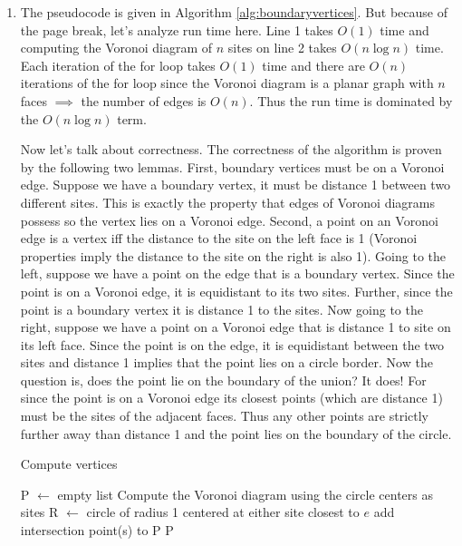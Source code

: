 \documentclass[11pt]{article}
\begin{document}
\answer
\begin{enumerate}
    \item The pseudocode is given in Algorithm \ref{alg:boundaryvertices}.
    But because of the page break, let's analyze run time here.
    Line 1 takes $O(1)$ time and computing the Voronoi diagram of $n$ sites on line 2 takes $O(n \log n)$ time.
    Each iteration of the for loop takes $O(1)$ time and there are $O(n)$ iterations of the for loop since the Voronoi diagram is a planar graph with $n$ faces $\implies$ the number of edges is $O(n)$.
    Thus the run time is dominated by the $O(n \log n)$ term. 
    
    Now let's talk about correctness.
    The correctness of the algorithm is proven by the following two lemmas.
    First, boundary vertices must be on a Voronoi edge.
    Suppose we have a boundary vertex, it must be distance 1 between two different sites.
    This is exactly the property that edges of Voronoi diagrams possess so the vertex lies on a Voronoi edge.
    Second, a point on an Voronoi edge is a vertex iff the distance to the site on the left face is 1 (Voronoi properties imply the distance to the site on the right is also 1).
    Going to the left, suppose we have a point on the edge that is a boundary vertex.
    Since the point is on a Voronoi edge, it is equidistant to its two sites.
    Further, since the point is a boundary vertex it is distance 1 to the sites.
    Now going to the right, suppose we have a point on a Voronoi edge that is distance 1 to site on its left face.
    Since the point is on the edge, it is equidistant between the two sites and distance 1 implies that the point lies on a circle border.
    Now the question is, does the point lie on the boundary of the union?
    It does!
    For since the point is on a Voronoi edge its closest points (which are distance 1) must be the sites of the adjacent faces.
    Thus any other points are strictly further away than distance 1 and the point lies on the boundary of the circle.
    
    \begin{algorithm}
    \caption{Compute vertices}
    \label{alg:boundaryvertices}
    \begin{algorithmic}[1]
        \State P $\gets$ empty list
        \State Compute the Voronoi diagram using the circle centers as sites
            \State R $\gets$ circle of radius 1 centered at either site closest to $e$
                \State add intersection point(s) to P
            \EndIf
        \EndFor
        \State \Return P
    \EndFunction
    \end{algorithmic}
    \end{algorithm}
    

\end{enumerate}
\end{document}
